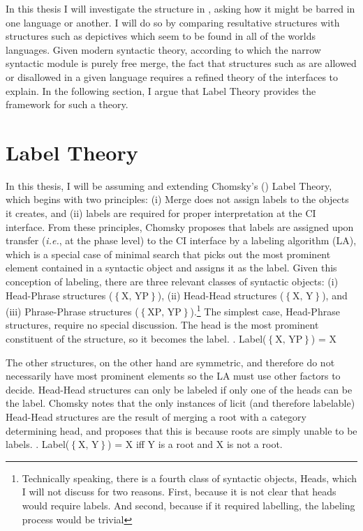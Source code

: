 \documentclass[letterpaper,12pt]{article}
\newcommand{\hxp}{$\left\{ \text{X, YP} \right\}$}
\newcommand{\hh}{$\left\{ \text{X, Y} \right\}$}
\begin{document}
In this thesis I will investigate the structure in \Last, asking how it might be barred in one language or another.
I will do so by comparing resultative structures with structures such as depictives which seem to be found in all of the worlds languages.
Given modern syntactic theory, according to which the narrow syntactic module is purely free merge, the fact that structures such as \Last are allowed or disallowed in a given language requires a refined theory of the interfaces to explain.
In the following section, I argue that Label Theory \parencite{chomsky2013problems,chomsky2015problems} provides the framework for such a theory.

\section{Label Theory}
In this thesis, I will be assuming and extending Chomsky's (\citeyear{chomsky2013problems,chomsky2015problems}) Label Theory, which begins with two principles: (i) Merge does not assign labels to the objects it creates, and (ii) labels are required for proper interpretation at the CI interface.
From these principles, Chomsky proposes that labels are assigned upon transfer (\textit{i.e.}, at the phase level) to the CI interface by a labeling algorithm (LA), which is a special case of minimal search that picks out the most prominent element contained in a syntactic object and assigns it as the label.
Given this conception of labeling, there are three relevant classes of syntactic objects: (i) Head-Phrase structures ($\left\{ \text{X, YP} \right\}$), (ii) Head-Head structures ($\left\{ \text{X, Y} \right\}$), and (iii) Phrase-Phrase structures ($\left\{ \text{XP, YP} \right\}$).\footnote{
  Technically speaking, there is a fourth class of syntactic objects, Heads, which I will not discuss for two reasons. First, because it is not clear that heads would require labels. And second, because if it required labelling, the labeling process would be trivial
}
The simplest case, Head-Phrase structures, require no special discussion.
The head is the most prominent constituent of the structure, so it becomes the label.
\ex. Label(\hxp) = X

The other structures, on the other hand are symmetric, and therefore do not necessarily have most prominent elements so the LA must use other factors to decide.
Head-Head structures can only be labeled if only one of the heads can be the label.
Chomsky notes that the only instances of licit (and therefore labelable) Head-Head structures are the result of merging a root with a category determining head, and proposes that this is because roots are simply unable to be labels.
\ex. Label(\hh) = X iff Y is a root and X is not a root.
\end{document}
